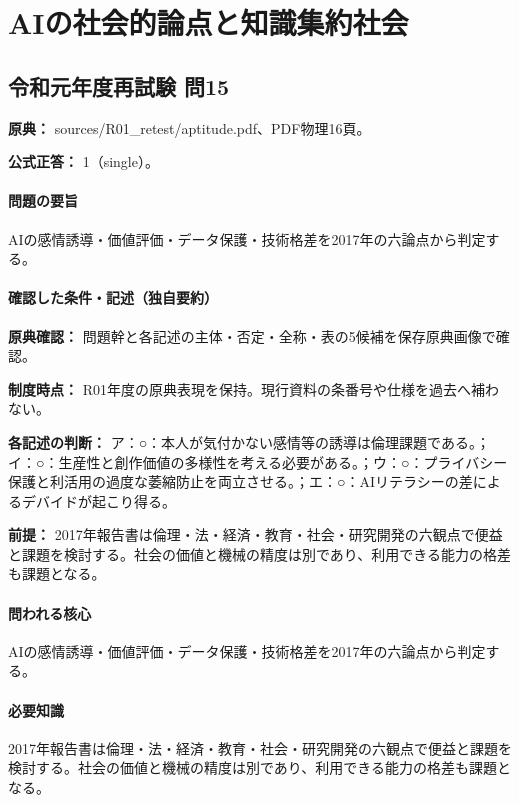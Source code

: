 \section{AIの社会的論点と知識集約社会}

\subsection{令和元年度再試験 問15}
\label{q:r01-ret-apt-15}

\noindent\textbf{原典：} sources/R01\_retest/aptitude.pdf、PDF物理16頁。

\textbf{公式正答：} 1（single）。

\paragraph{問題の要旨} AIの感情誘導・価値評価・データ保護・技術格差を2017年の六論点から判定する。

\paragraph{確認した条件・記述（独自要約）}\mbox{}\par

\noindent\textbf{原典確認：} 問題幹と各記述の主体・否定・全称・表の5候補を保存原典画像で確認。\par

\noindent\textbf{制度時点：} R01年度の原典表現を保持。現行資料の条番号や仕様を過去へ補わない。\par

\noindent\textbf{各記述の判断：} ア：○：本人が気付かない感情等の誘導は倫理課題である。；イ：○：生産性と創作価値の多様性を考える必要がある。；ウ：○：プライバシー保護と利活用の過度な萎縮防止を両立させる。；エ：○：AIリテラシーの差によるデバイドが起こり得る。\par

\noindent\textbf{前提：} 2017年報告書は倫理・法・経済・教育・社会・研究開発の六観点で便益と課題を検討する。社会の価値と機械の精度は別であり、利用できる能力の格差も課題となる。\par

\paragraph{問われる核心} AIの感情誘導・価値評価・データ保護・技術格差を2017年の六論点から判定する。

\paragraph{必要知識} 2017年報告書は倫理・法・経済・教育・社会・研究開発の六観点で便益と課題を検討する。社会の価値と機械の精度は別であり、利用できる能力の格差も課題となる。

